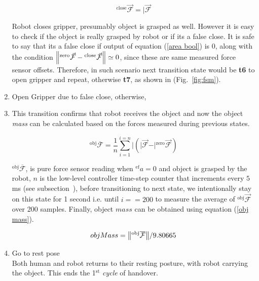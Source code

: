 \begin{enumerate}[start=0,label={\bf{t}\arabic*:}]
        \begin{equation}\label{Fclose}
        {}^\text{close}\vec{\mathcal{F}} = \vert{\vec{\mathcal{F}}}
        \end{equation}
    
    Robot closes gripper, presumably object is grasped as well. However it is easy to check if the object is really grasped by robot or if its a false close. It is safe to say that its a false close if output of equation (\ref{area bool}) is $0$, along with the condition $\norm{{}^\text{zero}\vec{\mathcal{F}}-{}^\text{close}\vec{\mathcal{F}}} \simeq{0}$, since these are same measured force sensor offsets. Therefore, in such scenario next transition state would be \textbf{t6} to open gripper and repeat, otherwise \textbf{t7}, as shown in (Fig.~\ref{fig:fsm}).
    
    \item Open Gripper due to false close, otherwise,
    
    \item This transition confirms that robot receives the object and now the object \textit{mass} can be calculated based on the forces measured during previous states.
    
    \begin{equation}
        {}^\text{obj}\overline{\mathcal{F}} = \frac{1}{n}\sum_{i=1}^{i=n} \vert{ (\vert{\vec{\mathcal{F}}} - \vert{{}^\text{zero}\vec{\mathcal{F}}}) }
    \end{equation}
    
    ${}^\text{obj}\overline{\mathcal{F}}$, is pure force sensor reading when ${}^{\text{ef}}a=0$ and object is grasped by the robot, $n$ is the low-level controller time-step counter that increments every $5$ms (see subsection~), before transitioning to next state, we intentionally stay on this state for 1 second i.e. until $i==200$ to measure the average of ${}^\text{obj}\vec{\mathcal{F}}$ over 200 samples. Finally, object $mass$ can be obtained using equation (\ref{obj mass}).
    
    \begin{equation}\label{obj mass}
        objMass = \norm{{}^\text{obj}\overline{\mathcal{F}}}/9.80665
    \end{equation}

    \item Go to rest pose \\
    Both human and robot returns to their resting posture, with robot carrying the object. This ends the 1$^\text{st}$ \textit{cycle} of handover.
    

\end{enumerate}
